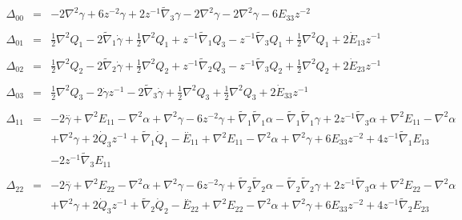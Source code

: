 \documentclass[10pt,letterpaper]{article}
\numberwithin{equation}{section}
\begin{document}
\begin{eqnarray}
\Delta_{00}&=& -2 \nabla^{2}{}\gamma + 6 z^{-2} \gamma + 2 z^{-1} \tilde{\nabla}_{3}\gamma -2 \nabla^{2}{}\gamma -2 \nabla^{2}{}\gamma - 6 E_{33} z^{-2}
\\  \nonumber\\ 
\Delta_{01}&=& \tfrac{1}{2} \nabla^{2}{}Q_{1} - 2 \tilde{\nabla}_{1}\dot{\gamma}+\tfrac{1}{2} \nabla^{2}{}Q_{1} + z^{-1} \tilde{\nabla}_{1}Q_{3} -  z^{-1} \tilde{\nabla}_{3}Q_{1}+\tfrac{1}{2} \nabla^{2}{}Q_{1} + 2 \dot{E}_{13} z^{-1}
\\  \nonumber\\ 
\Delta_{02}&=& \tfrac{1}{2} \nabla^{2}{}Q_{2} - 2 \tilde{\nabla}_{2}\dot{\gamma}+\tfrac{1}{2} \nabla^{2}{}Q_{2} + z^{-1} \tilde{\nabla}_{2}Q_{3} -  z^{-1} \tilde{\nabla}_{3}Q_{2}+\tfrac{1}{2} \nabla^{2}{}Q_{2} + 2 \dot{E}_{23} z^{-1}
\\  \nonumber\\ 
\Delta_{03}&=& \tfrac{1}{2} \nabla^{2}{}Q_{3} - 2 \dot{\gamma} z^{-1} - 2 \tilde{\nabla}_{3}\dot{\gamma}+\tfrac{1}{2} \nabla^{2}{}Q_{3}+\tfrac{1}{2} \nabla^{2}{}Q_{3} + 2 \dot{E}_{33} z^{-1}
\\  \nonumber\\ 
\Delta_{11}&=& -2 \overset{..}{\gamma} + \nabla^{2}{}E_{11} -  \nabla^{2}{}\alpha + \nabla^{2}{}\gamma - 6 z^{-2} \gamma + \tilde{\nabla}_{1}\tilde{\nabla}_{1}\alpha -  \tilde{\nabla}_{1}\tilde{\nabla}_{1}\gamma + 2 z^{-1} \tilde{\nabla}_{3}\alpha +\nabla^{2}{}E_{11} -  \nabla^{2}{}\alpha \nonumber \\ 
&& + \nabla^{2}{}\gamma + 2 \dot{Q}_{3} z^{-1} + \tilde{\nabla}_{1}\dot{Q}_{1}- \overset{..}{E}_{11} + \nabla^{2}{}E_{11} -  \nabla^{2}{}\alpha + \nabla^{2}{}\gamma + 6 E_{33} z^{-2} + 4 z^{-1} \tilde{\nabla}_{1}E_{13} \nonumber \\ 
&& - 2 z^{-1} \tilde{\nabla}_{3}E_{11}
\\  \nonumber\\ 
\Delta_{22}&=& -2 \overset{..}{\gamma} + \nabla^{2}{}E_{22} -  \nabla^{2}{}\alpha + \nabla^{2}{}\gamma - 6 z^{-2} \gamma + \tilde{\nabla}_{2}\tilde{\nabla}_{2}\alpha -  \tilde{\nabla}_{2}\tilde{\nabla}_{2}\gamma + 2 z^{-1} \tilde{\nabla}_{3}\alpha +\nabla^{2}{}E_{22} -  \nabla^{2}{}\alpha \nonumber \\ 
&& + \nabla^{2}{}\gamma + 2 \dot{Q}_{3} z^{-1} + \tilde{\nabla}_{2}\dot{Q}_{2}- \overset{..}{E}_{22} + \nabla^{2}{}E_{22} -  \nabla^{2}{}\alpha + \nabla^{2}{}\gamma + 6 E_{33} z^{-2} + 4 z^{-1} \tilde{\nabla}_{2}E_{23} \nonumber \\ 

\end{eqnarray}
\end{document}
